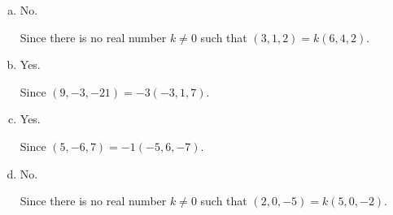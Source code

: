 \begin{Exercise}
	\begin{enumerate}[(a)]
		\item 
		\begin{answer}
			No.
		\end{answer}
		\begin{solution}
			Since there is no real number $k\neq 0$ such that $(3,1,2)=k(6,4,2)$.
		\end{solution}
		
		\item
		\begin{answer}
			Yes.
		\end{answer}
		\begin{solution}
			Since $(9,-3,-21) = -3(-3,1,7)$.
		\end{solution}
		
		\item
		\begin{answer}
			Yes.
		\end{answer}
		\begin{solution}
			Since $(5,-6,7) = -1(-5,6,-7)$.
		\end{solution}
		
		\item
		\begin{answer}
			No.
		\end{answer}
		\begin{solution}
			Since there is no real number $k\neq 0$ such that $(2,0,-5)=k(5,0,-2)$.
		\end{solution}
	\end{enumerate}
\end{Exercise}